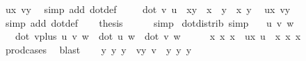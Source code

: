 \begin{isabellebody}
\ ux\ vy\ \isamarkupfalse%
\ {\isacharparenleft}{\kern0pt}simp\ add{\isacharcolon}{\kern0pt}\ dot{\isacharunderscore}{\kern0pt}def{\isacharparenright}{\kern0pt}\isanewline
\ \ \isamarkupfalse%
\ {}{\isacharcolon}{\kern0pt}\ {\isachardoublequoteopen}dot\ v\ u\ {\isacharequal}{\kern0pt}\ x{}{\isacharasterisk}{\kern0pt}y{}\ {\isacharplus}{\kern0pt}\ x{}\ {\isacharasterisk}{\kern0pt}\ y{}\ {\isacharplus}{\kern0pt}\ x{}\ {\isacharasterisk}{\kern0pt}y{}{\isachardoublequoteclose}\ \isamarkupfalse%
\ ux\ vy\ \isamarkupfalse%
\ {\isacharparenleft}{\kern0pt}simp\ add{\isacharcolon}{\kern0pt}\ dot{\isacharunderscore}{\kern0pt}def{\isacharparenright}{\kern0pt}\isanewline
\ \ \isamarkupfalse%
\ {\isacharquery}{\kern0pt}thesis\ \isamarkupfalse%
\ {}\ {}\ \isamarkupfalse%
\ simp\isanewline
{}\isamarkupfalse%
%
\endisatagproof
{\isafoldproof}%
%
\isadelimproof
\isanewline
%
\endisadelimproof
\isanewline
{}\isamarkupfalse%
\ dot{\isacharunderscore}{\kern0pt}distrib\ {\isacharbrackleft}{\kern0pt}simp{\isacharbrackright}{\kern0pt}{\isacharcolon}{\kern0pt}\isanewline
\ \ \ u\ v\ w\isanewline
\ \ \ {\isachardoublequoteopen}dot\ {\isacharparenleft}{\kern0pt}vplus\ u\ v{\isacharparenright}{\kern0pt}\ w\ {\isacharequal}{\kern0pt}\ dot\ u\ w\ {\isacharplus}{\kern0pt}\ dot\ v\ w{\isachardoublequoteclose}\isanewline
%
\isadelimproof
%
\endisadelimproof
%
\isatagproof
{}\isamarkupfalse%
\ {\isacharminus}{\kern0pt}\isanewline
\ \ \isamarkupfalse%
\ x{}\ x{}\ x{}\ \ ux{\isacharcolon}{\kern0pt}\ {\isachardoublequoteopen}u\ {\isacharequal}{\kern0pt}\ {\isacharparenleft}{\kern0pt}x{}{\isacharcomma}{\kern0pt}\ x{}{\isacharcomma}{\kern0pt}\ x{}{\isacharparenright}{\kern0pt}{\isachardoublequoteclose}\ \isamarkupfalse%
\ prod{\isacharunderscore}{\kern0pt}cases{}\ \isamarkupfalse%
\ blast\isanewline
\ \ \isamarkupfalse%
\ y{}\ y{}\ y{}\ \ vy{\isacharcolon}{\kern0pt}\ {\isachardoublequoteopen}v\ {\isacharequal}{\kern0pt}\ {\isacharparenleft}{\kern0pt}y{}{\isacharcomma}{\kern0pt}\ y{}{\isacharcomma}{\kern0pt}\ y{}{\isacharparenright}{\kern0pt}{\isachardoublequoteclose}\ \isamarkupfalse%

\end{isabellebody}
